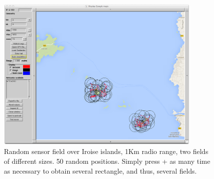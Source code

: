 \begin{figure}[hbtp]
\begin{center}
\includegraphics[width=10cm]{MolenePlus.png}
\caption{Random sensor field over Iroise islands, 1Km radio range, two fields of different sizes. 50 random positions.
Simply press + as many time as necessary to obtain several rectangle, and thus, several fields. }
\label{fig:enezEussa}
\end{center}
\end{figure}
